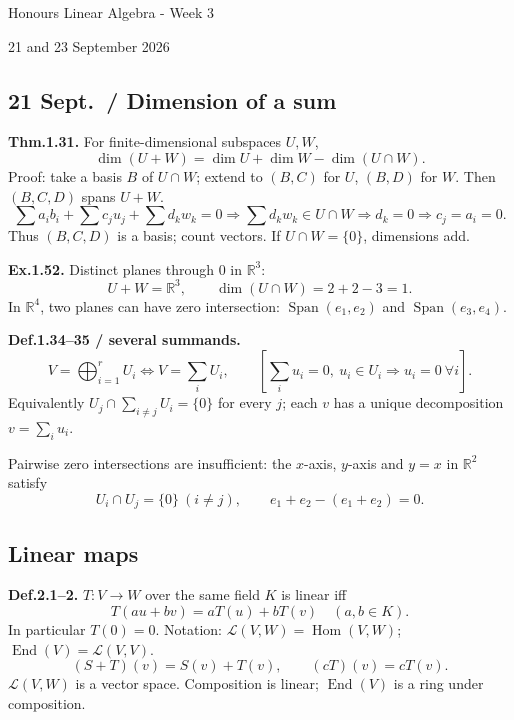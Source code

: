 \documentclass[11pt,letterpaper]{article}
\begin{document}
\begin{center}
{\LARGE Honours Linear Algebra - Week 3\par}
\vspace{5pt}
{\large 21 and 23 September 2026\par}
\end{center}
\vspace{4pt}
\subsection{21 Sept.~/ Dimension of a
sum}\label{sept.-dimension-of-a-sum}

\textbf{Thm.1.31.} For finite-dimensional subspaces \(U,W\), \[
\dim(U+W)=\dim U+\dim W-\dim(U\cap W).
\] Proof: take a basis \(B\) of \(U\cap W\); extend to \((B,C)\) for
\(U\), \((B,D)\) for \(W\). Then \((B,C,D)\) spans \(U+W\). \[
\sum a_ib_i+\sum c_ju_j+\sum d_kw_k=0
\Rightarrow\sum d_kw_k\in U\cap W
\Rightarrow d_k=0\Rightarrow c_j=a_i=0.
\] Thus \((B,C,D)\) is a basis; count vectors. If \(U\cap W=\{0\}\),
dimensions add.

\textbf{Ex.1.52.} Distinct planes through \(0\) in \(\mathbb R^3\): \[
U+W=\mathbb R^3,\qquad \dim(U\cap W)=2+2-3=1.
\] In \(\mathbb R^4\), two planes can have zero intersection:
\(\operatorname{Span}(e_1,e_2)\) and \(\operatorname{Span}(e_3,e_4)\).

\textbf{Def.1.34--35 / several summands.} \[
V=\bigoplus_{i=1}^rU_i
\iff V=\sum_iU_i,\qquad
\left[\sum_i u_i=0,\ u_i\in U_i\Rightarrow u_i=0\ \forall i\right].
\] Equivalently \(U_j\cap\sum_{i\ne j}U_i=\{0\}\) for every \(j\); each
\(v\) has a unique decomposition \(v=\sum_i u_i\).

Pairwise zero intersections are insufficient: the \(x\)-axis, \(y\)-axis
and \(y=x\) in \(\mathbb R^2\) satisfy \[
U_i\cap U_j=\{0\}\ (i\ne j),\qquad e_1+e_2-(e_1+e_2)=0.
\]

\subsection{Linear maps}\label{linear-maps}

\textbf{Def.2.1--2.} \(T:V\to W\) over the same field \(K\) is linear
iff \[
T(au+bv)=aT(u)+bT(v)\quad(a,b\in K).
\] In particular \(T(0)=0\). Notation:
\(\mathcal L(V,W)=\operatorname{Hom}(V,W)\);
\(\operatorname{End}(V)=\mathcal L(V,V)\). \[
(S+T)(v)=S(v)+T(v),\qquad(cT)(v)=cT(v).
\] \(\mathcal L(V,W)\) is a vector space. Composition is linear;
\(\operatorname{End}(V)\) is a ring under composition.
\end{document}
